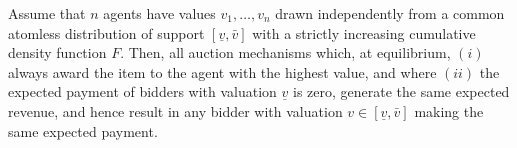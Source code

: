 %
%
%
%

\begin{theorem}
\label{thm:auc:revenue}
Assume that $n$ agents have values $v_1,\dots,v_n$ drawn independently from a common atomless distribution of support $[\underline{v},\bar{v}]$ with a strictly increasing cumulative density function $F$. Then, all auction mechanisms which, at equilibrium, $(i)$ always award the item to the agent with the highest value, and where $(ii)$ the expected payment of bidders with valuation $\underline{v}$ is zero, generate the same expected revenue, and hence result in any bidder with valuation $v \in [\underline{v},\bar{v}]$ making the same expected payment.
\end{theorem}


